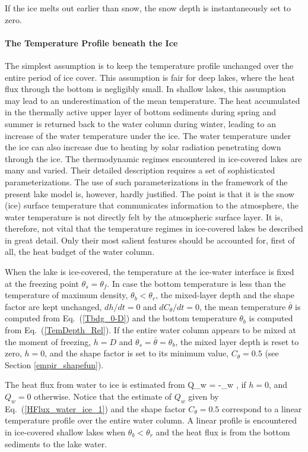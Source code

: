 If the ice melts out earlier than snow, 
the snow depth is instantaneously set to zero.


\paragraph{The Temperature Profile beneath the Ice}\label{Tbelowice}
\nopagebreak
%
\noindent
The simplest assumption is to keep the temperature profile unchanged 
over the entire period of ice cover. This assumption is fair for deep lakes, 
where the heat flux through the bottom is negligibly small. In shallow lakes, 
this assumption may lead to an underestimation of the mean temperature.
The heat accumulated in the thermally active upper layer of bottom sediments
during spring and summer is returned back to the water column during winter,
leading to an increase of the water temperature under the ice.
The water temperature under the ice can also increase due to heating 
by solar radiation penetrating down through the ice.
The thermodynamic regimes encountered in ice-covered lakes are many and varied.
Their detailed description requires a set of sophisticated parameterizations.
The use of such parameterizations in the framework of the present lake model is,
however, hardly justified. 
The point is that it is the snow (ice) surface temperature 
that communicates information to the atmosphere, the water temperature is not 
directly felt by the atmospheric surface layer.
It is, therefore, not vital that the temperature regimes in ice-covered lakes 
be described in great detail. Only their most salient features should be accounted for,
first of all, the heat budget of the water column. 

When the lake is ice-covered, the temperature at the ice-water interface 
is fixed at the freezing point $\theta_s=\theta_{f}$.
In case the bottom temperature is less than the temperature of maximum density,
$\theta_b<\theta_r$, the mixed-layer depth and the shape factor are
kept unchanged, $dh/dt=0$ and $dC_{\theta}/dt=0$,
the mean temperature $\overline{\theta}$ is computed
from Eq.~(\ref{Tbdg_0-D}) and the bottom temperature $\theta_b$ 
is computed from Eq.~(\ref{TemDepth_Rel}). 
If the entire water column appears to be mixed at the moment of freezing, 
\ie $h=D$ and $\theta_s=\overline{\theta}=\theta_b$, 
the mixed layer depth is reset to zero, $h=0$, 
and the shape factor is set to its minimum value, $C_{\theta}=0.5$ 
(see Section \ref{empir_shapefun}). 

The heat flux from water to ice is estimated from 
%
\beq\label{HFlux_water_ice_1}
Q_w = -{\kappa_w} ,
\eeq
%
if $h=0$, and $Q_w=0$ otherwise.
Notice that the estimate of $Q_w$ given by Eq.~(\ref{HFlux_water_ice_1})
and the shape factor $C_{\theta}=0.5$ correspond to a linear 
temperature profile over the entire water column.
A linear profile is encountered in ice-covered shallow lakes when 
$\theta_b<\theta_r$ and the heat flux is from the bottom sediments to the lake water.

